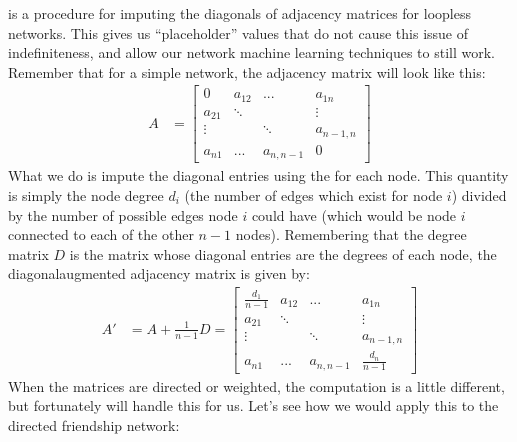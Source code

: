 \documentclass[letterpaper,10pt,english]{jupyterBook}
\begin{document}
\sphinxAtStartPar
{} is a procedure for imputing the diagonals of adjacency matrices for loopless networks. This gives us “placeholder” values that do not cause this issue of indefiniteness, and allow our network machine learning techniques to still work. Remember that for a simple network, the adjacency matrix will look like this:
\begin{align*}
    A &= \begin{bmatrix}
        0 & a_{12} & ... & a_{1n} \\
        a_{21}& \ddots & & \vdots \\
        \vdots & & \ddots & a_{n-1, n} \\
        a_{n1} &...& a_{n, n-1} & 0
    \end{bmatrix}
\end{align*}
\sphinxAtStartPar
What we do is impute the diagonal entries using the  for each node. This quantity is simply the node degree \(d_i\) (the number of edges which exist for node \(i\)) divided by the number of possible edges node \(i\) could have (which would be node \(i\) connected to each of the other \(n-1\) nodes). Remembering that the degree matrix \(D\) is the matrix whose diagonal entries are the degrees of each node, the diagonal\sphinxhyphen{}augmented adjacency matrix is given by:
\begin{align*}
    A' &= A + \frac{1}{n-1}D = \begin{bmatrix}
        \frac{d_1}{n-1} & a_{12} & ... & a_{1n} \\
        a_{21}& \ddots & & \vdots \\
        \vdots & & \ddots & a_{n-1, n} \\
        a_{n1} &...& a_{n, n-1} & \frac{d_n}{n-1}
    \end{bmatrix}
\end{align*}
\sphinxAtStartPar
When the matrices are directed or weighted, the computation is a little different, but fortunately  will handle this for us. Let’s see how we would apply this to the directed friendship network:

\begin{sphinxVerbatim}[commandchars=\\\{\}]
   

  
\end{sphinxVerbatim}
\end{document}
